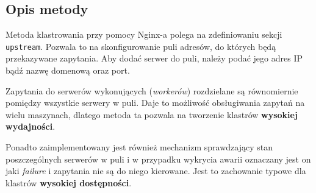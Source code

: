 {\subsection{Opis metody}
Metoda klastrowania przy pomocy Nginx-a polega na zdefiniowaniu sekcji \texttt{upstream}.
Pozwala to na skonfigurowanie puli adresów, do których będą przekazywane zapytania.
Aby dodać serwer do puli, należy podać jego adres IP bądź nazwę domenową oraz port.

Zapytania do serwerów wykonujących (\textit{workerów}) rozdzielane są równomiernie pomiędzy wszystkie serwery w puli.
Daje to możliwość obsługiwania zapytań na wielu maszynach, dlatego metoda ta pozwala na tworzenie klastrów \textbf{wysokiej wydajności}.

Ponadto zaimplementowany jest również mechanizm sprawdzający stan poszczególnych serwerów w puli i w przypadku wykrycia awarii oznaczany jest on jaki \textit{failure} i zapytania nie są do niego kierowane.
Jest to zachowanie typowe dla klastrów \textbf{wysokiej dostępności}.

}
